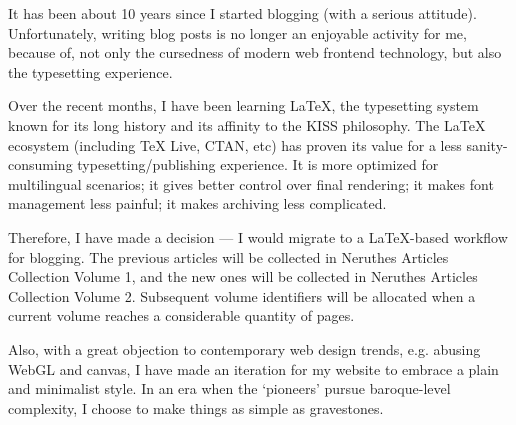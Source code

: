 
It has been about 10 years since I started blogging (with a serious attitude).
Unfortunately, writing blog posts is no longer an enjoyable activity for me,
because of, not only the cursedness of modern web frontend technology,
but also the typesetting experience.

Over the recent months, I have been learning \LaTeX{},
the typesetting system known for its long history and its affinity to the KISS philosophy.
The \LaTeX{} ecosystem (including \TeX{} Live, CTAN, etc)
has proven its value for a less sanity-consuming typesetting/publishing experience.
It is more optimized for multilingual scenarios; it gives better control over final rendering;
it makes font management less painful; it makes archiving less complicated.

Therefore, I have made a decision ---
I would migrate to a \LaTeX{}-based workflow for blogging.
The previous articles will be collected in \textsf{Neruthes Articles Collection Volume 1},
and the new ones will be collected in \textsf{Neruthes Articles Collection Volume 2}.
Subsequent volume identifiers will be allocated when a current volume reaches a considerable quantity of pages.

Also, with a great objection to contemporary web design trends,
e.g. abusing WebGL and canvas,
I have made an iteration for my website to embrace a plain and minimalist style.
In an era when the `pioneers' pursue baroque-level complexity,
I choose to make things as simple as gravestones.
